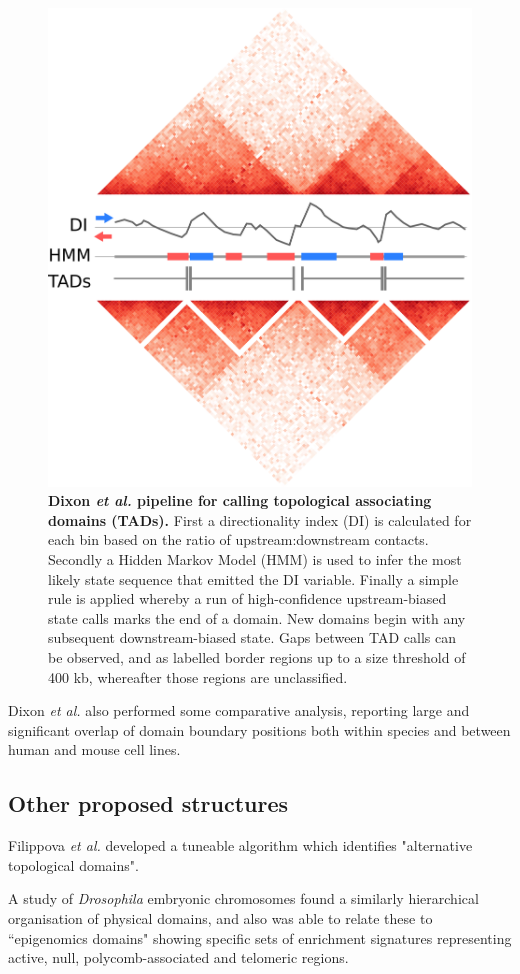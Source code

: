 \documentclass[a4paper,10pt,oneside]{book}
\begin{document}
\begin{figure}
\begin{center}
\includegraphics[width=.5\textwidth]{figs/di_example.png}
\captionsetup{width=1.2\textwidth}
\caption{ {\bf Dixon \emph{et al.}\cite{Dixon2012} pipeline for calling topological associating domains (TADs).} First a directionality index (DI) is calculated for each bin based on the ratio of upstream:downstream contacts. Secondly a Hidden Markov Model (HMM) is used to infer the most likely state sequence that emitted the DI variable. Finally a simple rule is applied whereby a run of high-confidence upstream-biased state calls marks the end of a domain. New domains begin with any subsequent downstream-biased state. Gaps between TAD calls can be observed, and as labelled border regions up to a size threshold of 400 kb, whereafter those regions are unclassified.\cite{Dixon2012}
}\label{fig:dicalc}
\end{center}
\end{figure} 

Dixon \emph{et al.}\cite{Dixon2012} also performed some comparative analysis, reporting large and significant overlap of domain boundary positions both within species and between human and mouse cell lines.

\subsection{Other proposed structures}

Filippova \emph{et al.}\cite{Filippova2014} developed a tuneable algorithm which identifies "alternative topological domains".

A study of \emph{Drosophila} embryonic chromosomes found a similarly hierarchical organisation of physical domains, and also was able to relate these to ``epigenomics domains" showing specific sets of enrichment signatures representing active, null, polycomb-associated and telomeric regions.\cite{Sexton2012} 
\end{document}
